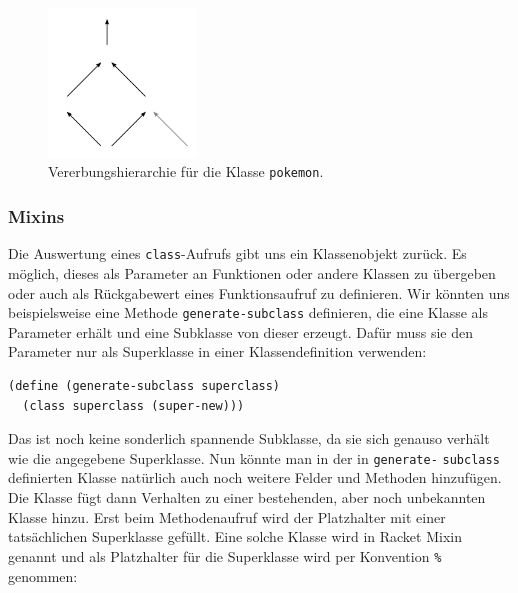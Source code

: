 \begin{figure}[h]
 \centering
 \includegraphics[width=0.35\textwidth]{pictures/hirarchy}
 \caption{Vererbungshierarchie für die Klasse \texttt{pokemon}.}
 \label{hirarchy}
\end{figure}


\subsubsection{Mixins}
Die Auswertung eines \texttt{class}-Aufrufs gibt uns ein Klassenobjekt zurück. Es möglich, dieses als Parameter an Funktionen oder andere Klassen zu übergeben oder auch als Rückgabewert eines Funktionsaufruf zu definieren. Wir könnten uns beispielsweise eine Methode \texttt{generate-subclass} definieren, die eine Klasse als Parameter erhält und eine Subklasse von dieser erzeugt. Dafür muss sie den Parameter nur als Superklasse in einer Klassendefinition verwenden:

\begin{lstlisting}
(define (generate-subclass superclass)
  (class superclass (super-new)))
\end{lstlisting} 

Das ist noch keine sonderlich spannende Subklasse, da sie sich genauso verhält wie die angegebene Superklasse.
% 
% 
% 
% 
% 
Nun könnte man in der in \texttt{generate-} \texttt{subclass} definierten Klasse natürlich auch noch weitere Felder und Methoden hinzufügen. Die Klasse fügt dann Verhalten zu einer bestehenden, aber noch unbekannten Klasse hinzu. Erst beim Methodenaufruf wird der Platzhalter mit einer tatsächlichen Superklasse gefüllt. Eine solche Klasse wird in Racket Mixin genannt und als Platzhalter für die Superklasse wird per Konvention \texttt{\%} genommen:

